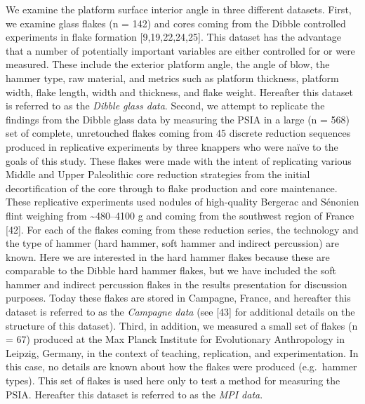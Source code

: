 \documentclass[10pt,letterpaper]{article}
\begin{document}
We examine the platform surface interior angle in three different
datasets. First, we examine glass flakes (n = 142) and cores coming from
the Dibble controlled experiments in flake formation
{[}9,19,22,24,25{]}. This dataset has the advantage that a number of
potentially important variables are either controlled for or were
measured. These include the exterior platform angle, the angle of blow,
the hammer type, raw material, and metrics such as platform thickness,
platform width, flake length, width and thickness, and flake weight.
Hereafter this dataset is referred to as the \emph{Dibble glass data}.
Second, we attempt to replicate the findings from the Dibble glass data
by measuring the PSIA in a large (n = 568) set of complete, unretouched
flakes coming from 45 discrete reduction sequences produced in
replicative experiments by three knappers who were naïve to the goals of
this study. These flakes were made with the intent of replicating
various Middle and Upper Paleolithic core reduction strategies from the
initial decortification of the core through to flake production and core
maintenance. These replicative experiments used nodules of high-quality
Bergerac and Sénonien flint weighing from \textasciitilde480--4100 g and
coming from the southwest region of France {[}42{]}. For each of the
flakes coming from these reduction series, the technology and the type
of hammer (hard hammer, soft hammer and indirect percussion) are known.
Here we are interested in the hard hammer flakes because these are
comparable to the Dibble hard hammer flakes, but we have included the
soft hammer and indirect percussion flakes in the results presentation
for discussion purposes. Today these flakes are stored in Campagne,
France, and hereafter this dataset is referred to as the \emph{Campagne
data} (see {[}43{]} for additional details on the structure of this
dataset). Third, in addition, we measured a small set of flakes (n = 67)
produced at the Max Planck Institute for Evolutionary Anthropology in
Leipzig, Germany, in the context of teaching, replication, and
experimentation. In this case, no details are known about how the flakes
were produced (e.g.~hammer types). This set of flakes is used here only
to test a method for measuring the PSIA. Hereafter this dataset is
referred to as the \emph{MPI data}.
\end{document}
